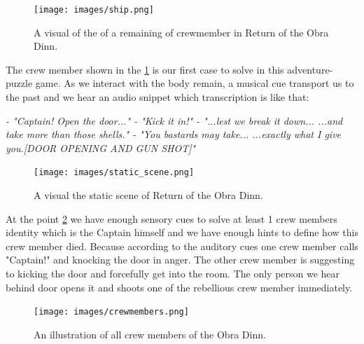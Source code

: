             \begin{figure}[H]
                \centering
                \texttt{[image: images/ship.png]}
                \caption{A visual of the of a remaining of crewmember in Return of the Obra Dinn.}
                \label{fig:CREWMEMBER}
            \end{figure}

            The crew member shown in the \ref{fig:CREWMEMBER} is our first case to solve in this adventure-puzzle game. As we interact with the body remain, a musical cue transport us to the past and we hear an audio snippet which transcription is like that:\par
            \emph{
                \newline
                - "Captain! Open the door..."\newline
                - "Kick it in!"\newline
                - "...lest we break it down... ...and take more than those shells."\newline
                - "You bastards may take... ...exactly what I give you.[DOOR OPENING AND GUN SHOT]"\newline
                }

            \begin{figure}[H]
                \centering
                \texttt{[image: images/static\_scene.png]}
                \caption{A visual the static scene of Return of the Obra Dinn.}
                \label{fig:STATICSCENE}
            \end{figure}            

            At the point \ref{fig:STATICSCENE} we have enough sensory cues to solve at least 1 crew members identity which is the Captain himself and we have enough hints to define how this crew member died. Because according to the auditory cues one crew member calls "Captain!" and knocking the door in anger. The other crew member is suggesting to kicking the door and forcefully get into the room. The only person we hear behind door opens it and shoots one of the rebellious crew member immediately.\par

            \begin{figure}[H]
                \centering
                \texttt{[image: images/crewmembers.png]}
                \caption{An illustration of all crew members of the Obra Dinn.}
                \label{fig:SHIPCREW}
            \end{figure}   

